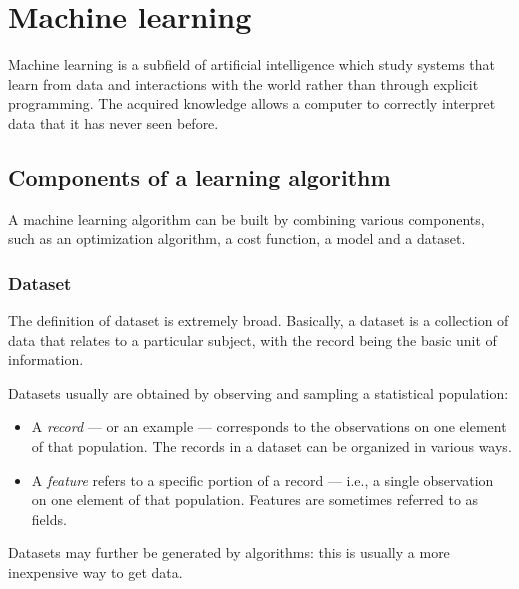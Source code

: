 \chapter{Machine learning}\label{ml_chapter}
    Machine learning is a subfield of artificial intelligence which study systems that learn from data and interactions with the world rather than through explicit programming. The acquired knowledge allows a computer to correctly interpret data that it has never seen before.
    \section{Components of a learning algorithm}\label{components_ml}
        A machine learning algorithm can be built by combining various components, such as an optimization algorithm, a cost function, a model and a dataset.
        \subsection{Dataset}
            The definition of dataset is extremely broad. Basically, a dataset is a collection of data that relates to a particular subject, with the record being the basic unit of information.
            
            Datasets usually are obtained by observing and sampling a statistical population:
            \begin{itemize}
                \item A \emph{record} --- or an example --- corresponds to the observations on one element of that population. The records in a dataset can be organized in various ways.
                \item A \emph{feature} refers to a specific portion of a record --- i.e., a single observation on one element of that population. Features are sometimes referred to as fields.
            \end{itemize}
            Datasets may further be generated by algorithms: this is usually a more inexpensive way to get data.
            

